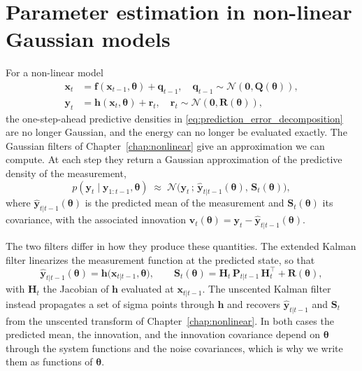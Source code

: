 \section{Parameter estimation in non-linear Gaussian models}
For a non-linear model
\begin{equation}\label{eq:nonlinear_param}
    \begin{aligned}
        \mathbf{x}_t &= \mathbf{f}(\mathbf{x}_{t-1}, \boldsymbol{\theta}) + \mathbf{q}_{t-1}, \quad \mathbf{q}_{t-1} \sim \mathcal{N}(\mathbf{0}, \mathbf{Q}(\boldsymbol{\theta})), \\
        \mathbf{y}_t &= \mathbf{h}(\mathbf{x}_t, \boldsymbol{\theta}) + \mathbf{r}_t, \quad \mathbf{r}_t \sim \mathcal{N}(\mathbf{0}, \mathbf{R}(\boldsymbol{\theta})),
    \end{aligned}
\end{equation}
the one-step-ahead predictive densities in \eqref{eq:prediction_error_decomposition} are no longer Gaussian, and the energy can no longer be evaluated exactly. The Gaussian filters of Chapter~\ref{chap:nonlinear} give an approximation we can compute. At each step they return a Gaussian approximation of the predictive density of the measurement,
\begin{equation}\label{eq:nonlinear_predictive}
    p(\mathbf{y}_t \mid \mathbf{y}_{1:t-1}, \boldsymbol{\theta})
    \;\approx\; \mathcal{N}\bigl(\mathbf{y}_t \,;\, \hat{\mathbf{y}}_{t|t-1}(\boldsymbol{\theta}),\, \mathbf{S}_t(\boldsymbol{\theta})\bigr),
\end{equation}
where $\hat{\mathbf{y}}_{t|t-1}(\boldsymbol{\theta})$ is the predicted mean of the measurement and $\mathbf{S}_t(\boldsymbol{\theta})$ its covariance, with the associated innovation $\mathbf{v}_t(\boldsymbol{\theta}) = \mathbf{y}_t - \hat{\mathbf{y}}_{t|t-1}(\boldsymbol{\theta})$.

The two filters differ in how they produce these quantities. The extended Kalman filter linearizes the measurement function at the predicted state, so that
\begin{equation*}
    \hat{\mathbf{y}}_{t|t-1}(\boldsymbol{\theta}) = \mathbf{h}\bigl(\mathbf{x}_{t|t-1}, \boldsymbol{\theta}\bigr), \qquad
    \mathbf{S}_t(\boldsymbol{\theta}) = \mathbf{H}_t\,\mathbf{P}_{t|t-1}\,\mathbf{H}_t^\top + \mathbf{R}(\boldsymbol{\theta}),
\end{equation*}
with $\mathbf{H}_t$ the Jacobian of $\mathbf{h}$ evaluated at $\mathbf{x}_{t|t-1}$. The unscented Kalman filter instead propagates a set of sigma points through $\mathbf{h}$ and recovers $\hat{\mathbf{y}}_{t|t-1}$ and $\mathbf{S}_t$ from the unscented transform of Chapter~\ref{chap:nonlinear}. In both cases the predicted mean, the innovation, and the innovation covariance depend on $\boldsymbol{\theta}$ through the system functions and the noise covariances, which is why we write them as functions of $\boldsymbol{\theta}$.

